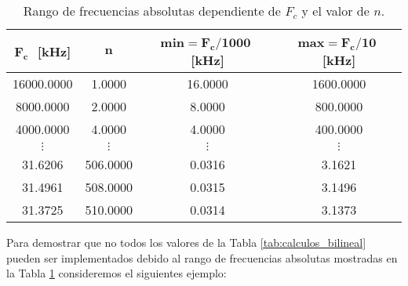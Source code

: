 	\begin{table}[!hbp]                                      
		\centering   
		\caption{Rango de frecuencias absolutas dependiente de $F_{c}$ y el valor de $n$.}                            
		\label{tab:frecuencias_absolutas}                                        
			\begin{tabular}{cccc}                        
			\hline                                              
			$\bm{F_{c}}\,\,$ [kHz] & $\bm{n}$ & \textbf{min}$\bm{=F_{c} / 1000}\,\,$ [kHz] & \textbf{max}$\bm{=F_{c} /10}\,\,$ [kHz] \\                    
			\hline                                              
			16000.0000 & 1.0000 & 16.0000 & 1600.0000 \\
			                                     
			8000.0000 & 2.0000 & 8.0000 & 800.0000 \\   
			                                     
			4000.0000 & 4.0000 & 4.0000 & 400.0000 \\   
			
			$\vdots$ & $\vdots$ & $\vdots$ & $\vdots$ \\  
			 
			31.6206 & 506.0000 & 0.0316 & 3.1621 \\     
			                                    
			31.4961 & 508.0000 & 0.0315 & 3.1496 \\     
			                                    
			31.3725 & 510.0000 & 0.0314 & 3.1373 \\      
			\hline                                           
			\end{tabular}                                                                
	\end{table} 

	Para demostrar que no todos los valores de la Tabla \ref{tab:calculos_bilineal} pueden ser implementados debido al rango de frecuencias absolutas mostradas en la Tabla \ref{tab:frecuencias_absolutas} consideremos el siguientes ejemplo:

